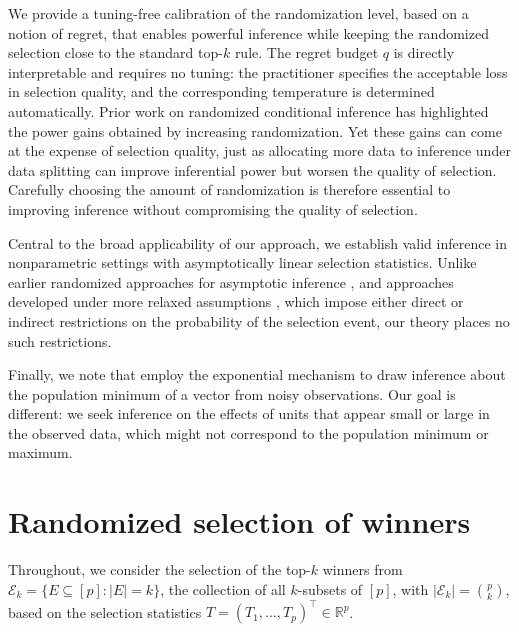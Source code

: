 \documentclass[12pt]{article}
\newcommand{\rbracket}[1]{\left[ #1 \right]}
\newcommand{\Ek}{\mathcal{E}_{k}}      %
\begin{document}
 \quad  We provide a tuning-free calibration of the randomization level, based on a notion of regret, that enables powerful inference while keeping the randomized selection close to the standard top-$k$ rule.
The regret budget $q$ is directly interpretable and requires no tuning: the practitioner specifies the acceptable loss in selection quality, and the corresponding temperature is determined automatically.
Prior work on randomized conditional inference \citep{randomizedresponse, kivaranovic2019length, panigrahi2021selection, panigrahi2023approximate, panigrahi2024exact} has highlighted the power gains obtained by increasing randomization. 
Yet these gains can come at the expense of selection quality, just as allocating more data to inference under data splitting can improve inferential power but worsen the quality of selection.
Carefully choosing the amount of randomization is therefore essential to improving inference without compromising the quality of selection.

 \quad Central to the broad applicability of our approach, we establish valid inference in nonparametric settings with asymptotically linear selection statistics.
Unlike earlier randomized approaches for asymptotic inference
\citep{randomizedresponse, rasines2023splitting, perry2026post}, and approaches
developed under more relaxed assumptions \citep{panigrahi2023carving,
bakshi2024selective}, which impose either direct or indirect restrictions on the probability of the selection event, our theory places no such restrictions.


Finally, we note that \citet{jinglei2024winners} employ the exponential mechanism to draw inference about the population minimum of a vector from noisy observations.
Our goal is different: we seek inference on the effects of units that appear small or large in the observed data, which might not correspond to the population minimum or maximum.


\section{Randomized selection of winners}
\label{sec:selection}

Throughout, we consider the selection of the top-$k$ winners from $\Ek = \{E \subseteq \rbracket{p} : |E| = k\}$, the collection of all $k$-subsets of $\rbracket{p}$, with $|\Ek| = \binom{p}{k}$, based on the selection statistics $T = (T_1,\ldots,T_p)^\top \in \mathbb{R}^p$.
\end{document}
